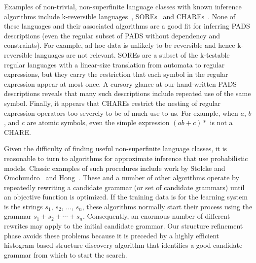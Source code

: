 Examples of non-trivial, non-superfinite
language classes with known inference algorithms include
k-reversible languages~\cite{angluin:revesible-language-inference},
SOREs~\cite{bex+:dtd-inference} and CHAREs~\cite{bex+:dtd-inference}.
None of these languages and their associated algorithms 
are a good fit for inferring PADS descriptions (even the
regular subset of PADS without dependency and constraints).  
For example, ad hoc data is unlikely to be reversible and hence
k-reversible languages are not relevant.  
SOREs are a subset of the k-testable
regular languages with a linear-size translation from automata to
regular expressions, but they carry the restriction that each symbol
in the regular expression appear at most once.  A cursory glance at
our hand-written PADS descriptions reveals that many such descriptions
include repeated use of the same symbol.  Finally, it appears that
CHAREs restrict the nesting of regular expression operators too severely to 
be of much use to us.  For example, when $a$, $b$, and $c$ are atomic symbols,
even the simple expression $(ab + c)*$ is not a CHARE.

Given the difficulty of finding useful non-superfinite language classes,
it is reasonable to turn to algorithms for approximate
inference that use probabilistic models.    
Classic examples of such procedures include work by Stolcke and
Omohundro~\cite{stolcke94inducing} 
and 
Hong~\cite{hong:thesis,hong01using}.  These and a number of other algorithms
operate by repeatedly rewriting a candidate grammar (or set of candidate
grammars) until an objective function is optimized.
If the training data is for the learning system is the strings
$s_1$, $s_2$, $\ldots$, $s_n$, these algorithms normally start their
process using the grammar $s_1 + s_2 + \cdots + s_n$.  Consequently,  
an enormous number of different rewrites may apply to the
initial candidate grammar.  Our structure refinement
phase avoids these problems 
because it is preceded by a highly efficient
histogram-based structure-discovery algorithm 
that identifies a good candidate grammar from which to start the search.  

